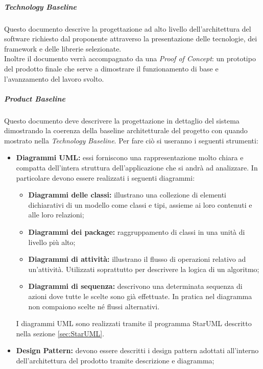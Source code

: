 		
			\subparagraph{Technology Baseline}
			\Spazio
			Questo documento descrive la progettazione ad alto livello dell'architettura del software richiesto dal proponente attraverso la presentazione delle tecnologie, dei framework e delle librerie selezionate. \\
			Inoltre il documento verrà accompagnato da una \textit{Proof of Concept}: un prototipo del prodotto finale che serve a dimostrare il funzionamento di base e l'avanzamento del lavoro svolto. 

			\subparagraph{Product Baseline}
			\Spazio
			Questo documento deve descrivere la progettazione in dettaglio del sistema dimostrando la coerenza della baseline architetturale del progetto con quando mostrato nella \textit{Technology Baseline}.
			Per fare ciò si useranno i seguenti strumenti:
				\begin{itemize}
					\item \textbf{Diagrammi UML:}
					essi forniscono una rappresentazione molto chiara e compatta dell'intera struttura dell'applicazione che si andrà ad analizzare. In particolare devono essere realizzati i seguenti diagrammi:
					\begin{itemize}
						\item \textbf{Diagrammi delle classi:} illustrano una collezione di elementi dichiarativi di un modello come classi e tipi, assieme ai loro contenuti e alle loro relazioni;
						\item \textbf{Diagrammi dei package:}  raggruppamento di classi in una unità di livello più alto;
						\item \textbf{Diagrammi di attività:} illustrano il flusso di operazioni relativo ad un'attività. Utilizzati soprattutto per descrivere la logica di un algoritmo;
						\item \textbf{Diagrammi di sequenza:} descrivono una determinata sequenza di azioni dove tutte le scelte sono già effettuate. In pratica nel diagramma non compaiono scelte né flussi alternativi.
					\end{itemize}
					I diagrammi UML sono realizzati tramite il programma StarUML descritto nella sezione \ref{sec:StarUML}.
					\item \textbf{Design Pattern:}
					devono essere descritti i design pattern adottati all'interno dell'architettura del prodotto tramite descrizione e diagramma;
				\end{itemize}
			
